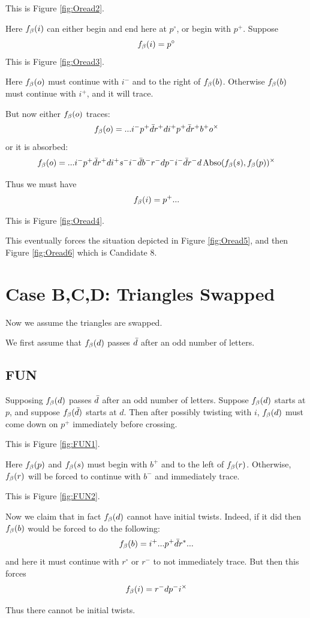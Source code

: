 This is Figure \ref{fig:Oread2}.

Here $f_\beta(i)$ can either begin and end here at $p^\circ$, or begin with $p^+$. Suppose 
\[
f_\beta(i) = p^\circ
\]
This is Figure \ref{fig:Oread3}. 

Here $f_\beta(o)$ must continue with $i^-$ and to the right of $f_\beta(b)$. Otherwise $f_\beta(b)$ must continue with $i^+$, and it will trace.

But now either $f_\beta(o)$ traces:
\[
f_\beta(o) =...i^-p^+ \bar{d} r^+ d i^+ p^+ \bar{d} r^+ b^+ o^\times
\]
or it is absorbed:
\[
f_\beta(o) = ...i^- p^+ \bar{d} r^+ d i^+ s^- i^- \bar{d} b^- r^- d p^- i^- \bar{d} r^- d \operatorname{Abso}(f_\beta(s), f_\beta(p))^\times
\]

Thus we must have
\[
f_\beta(i) = p^+...
\]

This is Figure \ref{fig:Oread4}.

This eventually forces the situation depicted in Figure \ref{fig:Oread5}, and then Figure \ref{fig:Oread6} which is Candidate 8.

\section{Case B,C,D: Triangles Swapped}\label{CaseBCDTrack8}
Now we assume the triangles are swapped.

We first assume that $f_\beta(d)$ passes $\bar{d}$ after an odd number of letters. 

\subsection{FUN}\label{FUN}
Supposing $f_\beta(d)$ passes $\bar{d}$ after an odd number of letters. Suppose $f_\beta(d)$ starts at $p$, and suppose $f_\beta(\bar{d})$ starts at $d$. Then after possibly twisting with $i$, $f_\beta(d)$ must come down on $p^+$ immediately before crossing. 

This is Figure \ref{fig:FUN1}.

Here $f_\beta(p)$ and $f_\beta(s)$ must begin with $b^+$ and to the left of $f_\beta(r)$. Otherwise, $f_\beta(r)$ will be forced to continue with $b^-$ and immediately trace. 

This is Figure \ref{fig:FUN2}.

Now we claim that in fact $f_\beta(d)$ cannot have initial twists. Indeed, if it did then $f_\beta(b)$ would be forced to do the following:
\[
f_\beta(b) = i^+... p^+ \bar{d} r^*...
\]
and here it must continue with $r^\circ$ or $r^-$ to not immediately trace. But then this forces
\[
f_\beta(i) = r^- d p^- i^\times
\]

Thus there cannot be initial twists.

